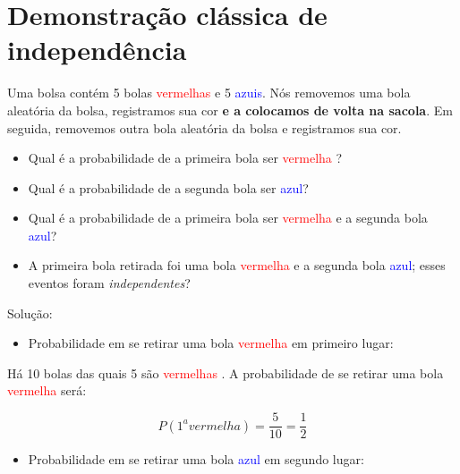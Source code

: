 \documentclass[
]{book}
\providecommand{\tightlist}{%
  \setlength{\itemsep}{0pt}\setlength{\parskip}{0pt}}
\begin{document}
\hfill\break

\hypertarget{demonstrauxe7uxe3o-cluxe1ssica-de-independuxeancia}{%
\section{Demonstração clássica de independência}\label{demonstrauxe7uxe3o-cluxe1ssica-de-independuxeancia}}

\hfill\break

Uma bolsa contém 5 bolas \textcolor{red}{vermelhas} e 5 \textcolor{blue}{azuis}. Nós removemos uma bola aleatória da bolsa, registramos sua cor \textbf{e a colocamos de volta na sacola}. Em seguida, removemos outra bola aleatória da bolsa e registramos sua cor.

\hfill\break

\begin{itemize}
\tightlist
\item
  Qual é a probabilidade de a primeira bola ser \textcolor{red}{vermelha} ?\\
\item
  Qual é a probabilidade de a segunda bola ser \textcolor{blue}{azul}?\\
\item
  Qual é a probabilidade de a primeira bola ser \textcolor{red}{vermelha} e a segunda bola \textcolor{blue}{azul}?\\
\item
  A primeira bola retirada foi uma bola \textcolor{red}{vermelha} e a segunda bola \textcolor{blue}{azul}; esses eventos foram \emph{independentes}?
\end{itemize}

\hfill\break

Solução:

\begin{itemize}
\tightlist
\item
  Probabilidade em se retirar uma bola \textcolor{red}{vermelha} em primeiro lugar:
\end{itemize}

\hfill\break

Há 10 bolas das quais 5 são \textcolor{red}{vermelhas} . A probabilidade de se retirar uma bola \textcolor{red}{vermelha} será:

\hfill\break

\[
P(1^{a} vermelha)= \frac{5}{10}= \frac{1}{2}
\]

\hfill\break

\begin{itemize}
\tightlist
\item
  Probabilidade em se retirar uma bola \textcolor{blue}{azul} em segundo lugar:
\end{itemize}
\end{document}
